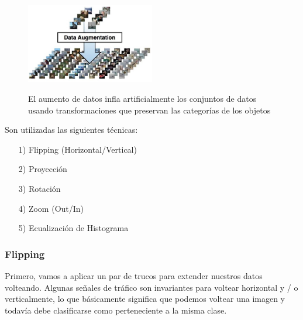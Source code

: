 		\begin{figure}[H]
		\begin{center}
		\includegraphics[width=0.5\textwidth ]{images/desarrollo/Augment/exampleaug}
		\end{center}
		\begin{center}
		\caption{\small{El aumento de datos infla artificialmente los conjuntos de datos usando transformaciones que preservan las categorías de los objetos}}
		{\small{\cite{DL_augmentData}}}
		\end{center}
		\vspace{-1.5em}
		\end{figure}


		Son utilizadas las siguientes técnicas:
		\begin{enumerate}
		\item[1)] Flipping (Horizontal/Vertical)
		\item[2)] Proyección
		\item[3)] Rotación
		\item[4)] Zoom (Out/In)
		\item[5)] Ecualización de Histograma
		\vskip 3cm
		\end{enumerate} 
		
		\subsubsection{Flipping}
		
			Primero, vamos a aplicar un par de trucos para extender nuestros datos volteando. Algunas señales de tráfico son invariantes para voltear horizontal y / o verticalmente, lo que básicamente significa que podemos voltear una imagen y todavía debe clasificarse como perteneciente a la misma clase.

